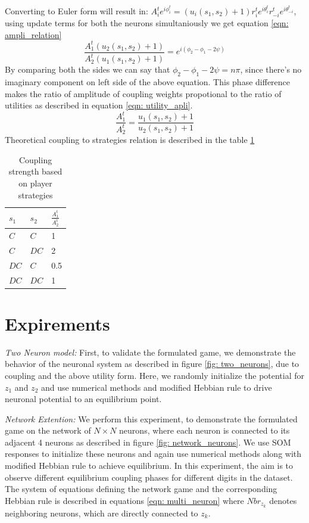 \documentclass{article}
\begin{document}
Converting to Euler form will result in: $A^t_i e^{i\phi^t_i} = (u_i(s_1, s_2) + 1) r^t_ie^{i\theta^t_i} r^t_{-i}e^{i\theta^t_{-i}}$, using update terms for both the neurons simultaniously we get equation \ref{eqn: ampli_relation}
\begin{equation}
\label{eqn: ampli_relation}
\frac{A_1^t (u_2(s_1, s_2) + 1)}{A_2^t (u_1(s_1, s_2) + 1)} = e^{i(\phi_2 - \phi_1 - 2\psi)}
\end{equation}
By comparing both the sides we can say that $\phi_2 - \phi_1 - 2\psi = n\pi$, since there's no imaginary component on left side of the above equation. This phase difference makes the ratio of amplitude of coupling weights propotional to the ratio of utilities as described in equation \ref{eqn: utility_apli}.
\begin{equation}
\label{eqn: utility_apli}
\frac{A_1^t}{A_2^t} = \frac{u_1(s_1, s_2) + 1}{u_2(s_1, s_2) + 1}
\end{equation}
Theoretical coupling to strategies relation is described in the table \ref{tab: ampli_relation}
\begin{table}
  \caption{Coupling strength based on player strategies}
  \label{tab: ampli_relation}
  \centering
  \begin{tabular}{lll}
    \toprule
    $s_1$     & $s_2$     & $\frac{A^t_1}{A^t_2}$ \\
    \midrule
    $C$       & $C$       & 1   \\
    $C$       & $DC$      & 2   \\
    $DC$      & $C$       & 0.5   \\
    $DC$      & $DC$      & 1   \\
    \bottomrule
  \end{tabular}
\end{table}



\section{Expirements}
\label{exp}

\textit{Two Neuron model:} First, to validate the formulated game, we demonstrate the behavior of the neuronal system as described in figure \ref{fig: two_neurons}, due to coupling and the above utility form. Here, we randomly initialize the potential for $z_1$ and $z_2$ and use numerical methods and modified Hebbian rule to drive neuronal potential to an equilibrium point.

\textit{Network Extention:} We perform this experiment, to demonstrate the formulated game on the network of $N\times N$ neurons, where each neuron is connected to its adjacent 4 neurons as described in figure \ref{fig: network_neurons}. We use SOM responses to initialize these neurons and again use numerical methods along with modified Hebbian rule to achieve equilibrium. In this experiment, the aim is to observe different equilibrium coupling phases for different digits in the dataset. The system of equations defining the network game and the corresponding Hebbian rule is described in equations \ref{eqn: multi_neuron} where $Nbr_{z_k}$ denotes neighboring neurons, which are directly connected to $z_k$.
\end{document}
